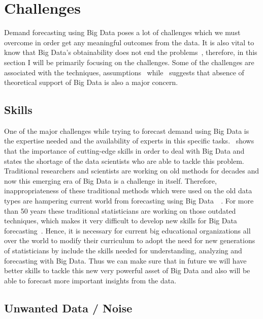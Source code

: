 \section{Challenges}
\label{Challenges}

Demand forecasting using Big Data poses a lot of challenges which we must overcome in order get any meaningful outcomes from the data. It is also vital to know that Big Data's obtainability does not end the problems~\cite{ba}, therefore, in this section I will be primarily focusing on the challenges. Some of the challenges are associated with the techniques, assumptions~\cite{silver2012signal} while~\cite {west_2013} suggests that absence of theoretical support of Big Data is also a major concern. 


\subsection{Skills}
\label{Skills}

One of the major challenges while trying to forecast demand using Big Data is the expertise needed and the availability of experts in this specific tasks.~\cite {arribas2014accidental} shows that the importance of cutting-edge skills in order to deal with Big Data and~\cite{wesson2014big} states the shortage of the data scientists who are able to tackle this problem. Traditional researchers and scientists are working on old methods for decades and now this emerging era of Big Data is a challenge in itself. Therefore, inappropriateness of these traditional methods which were used on the old data types are hampering current world from forecasting using Big Data~\cite{skupin20081}~\cite{arribas2014accidental}. For more than 50 years these traditional statisticians are working on those outdated techniques, which makes it very difficult to develop new skills for Big Data forecasting~\cite{einav2014data}. Hence, it is necessary for current big educational organizations all over the world to modify their curriculum to adopt the need for new generations of statisticians by include the skills needed for understanding, analyzing and forecasting with Big Data. Thus we can make sure that in future we will have better skills to tackle this new very powerful asset of Big Data and also will be able to forecast more important insights from the data. 



\subsection{Unwanted Data / Noise}
\label{noise}

